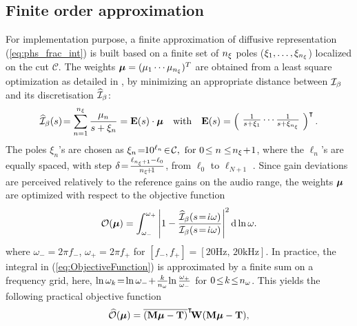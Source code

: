 \documentclass[10pt,a4paper]{article}
\begin{document}
{\subsection{Finite order approximation}
\label{sec:Finite_order_approximation}
For implementation purpose, a finite approximation of
diffusive representation (\ref{eq:phs_frac_int}) is built based on a
finite set of ${n_\xi}$ poles ($\xi_1, \dots, \xi_{n_\xi}$) localized on the cut $\mathcal{C}$.
The weights $\boldsymbol{\mu}=(\mu_1\cdots\mu_{n_\xi})^T$ are obtained from a least square optimization as detailed in \cite[sec. 5.1.2]{helie2006diffusive}, by minimizing an appropriate distance between ${\mathcal{I}}_\beta$ and its discretisation $\widehat{{\mathcal{I}}}_\beta$:
\begin{equation}
  \label{eq:ApproxHaMatrix}
  \widehat{{\mathcal{I}}}_\beta(s) \!= \sum_{n=1}^{n_\xi} \frac{\mu_n}{s+\xi_n} = \mathbf{E}(s)\cdot \boldsymbol{\mu} \quad \mbox{with}\quad \mathbf{E}(s)=
  \left(\!
     \begin{array}{c}
      \frac{1}{s+\xi_1} \cdots  \frac{1}{s+\xi_{n_\xi}}
     \end{array}
    \!\right)^\intercal.
\end{equation}										%
The poles $\xi_n$'s are chosen as $\xi_n  \!= \!\! 10^{\ell_n} \!\in\!\cC,
\mbox{~for~} 
0\!\leq n \leq\! \npoles\!+\!1$,
where the $\ell_n$'s are equally spaced, with step
$\delta\!=\!\frac{\ell_{{n_\xi}+1}-\ell_0}{{n_\xi}\!+\!1}$, from $\ell_0$ to
$\ell_{N+1}$ .
Since gain deviations are perceived relatively to
  the reference gains on the audio range, the weights $\boldsymbol{\mu}$ are optimized with respect to the objective function
\begin{equation}
  \label{eq:ObjectiveFunction}
  \mathcal{O}(\boldsymbol{\mu}) = \int_{\omega_{-}}^{\omega_{+}} \left|1-\frac{\widehat{{\mathcal{I}}}_\beta(s\!=\!{\dot\iota}\omega)}{{{\mathcal{I}}}_\beta (s\!=\!{\dot\iota}\omega)} \right|^2 \mathrm{d}\ln \omega.
\end{equation}
where $\omega_{-}=2\pi f_{-}$, $\omega_{+}=2\pi f_{+}$ for $[f_{-},f_{+}]=[20\mbox{Hz},\,20\mbox{kHz}]$.
%
In practice, the integral in (\ref{eq:ObjectiveFunction})
is approximated by a finite sum on a frequency grid,
here, $\ln \omega_k\!=\!\ln \omega_{-}\!  +\!  \frac{k}{{n_\omega}}
\!\ln\frac{\omega_{+}}{\omega_{-}}$ for $0\!\leq\! k\!\leq\!{n_\omega}$.
This yields the following practical objective function
\begin{equation}
  \widehat{\mathcal{O}}(\bmu) 
=  \herm{(\bf M \bmu - \mathbf{T})}\!  \Wv (\bf M \bmu - \mathbf{T}),

\end{equation}}
\end{document}
